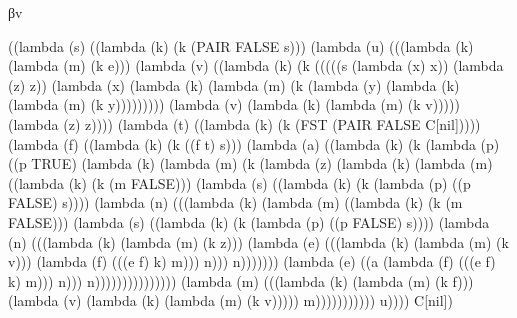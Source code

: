 \documentclass[ms,electronic,twosidetoc,letterpaper,chaptercenter,parttop]{byumsphd}
\begin{document}
\begin{theorem}
βv
\begin{schemedisplay}
((lambda (s) ((lambda (k) (k (PAIR FALSE s)))
        (lambda (u) (((lambda (k) (lambda (m) (k e)))
                (lambda (v) ((lambda (k) (k (((((s (lambda (x) x)) (lambda (z) z))
                                   (lambda (x) (lambda (k) (lambda (m) (k (lambda (y) (lambda (k) (lambda (m) (k y)))))))))
                                  (lambda (v) (lambda (k) (lambda (m) (k v))))) (lambda (z) z))))
                       (lambda (t) ((lambda (k) (k (FST
                                        (PAIR FALSE C[nil]))))
                              (lambda (f) ((lambda (k) (k ((f t) s)))
                                     (lambda (a) ((lambda (k) (k (lambda (p) ((p TRUE)
                                                            (lambda (k) (lambda (m) (k (lambda (z) (lambda (k) (lambda (m) ((lambda (k) (k (m FALSE)))
                                                                                              (lambda (s) ((lambda (k) (k (lambda (p) ((p FALSE) s))))
                                                                                                     (lambda (n) (((lambda (k) (lambda (m) ((lambda (k) (k (m FALSE)))
                                                                                                                          (lambda (s) ((lambda (k) (k (lambda (p) ((p FALSE) s))))
                                                                                                                                 (lambda (n) (((lambda (k) (lambda (m) (k z)))
                                                                                                                                         (lambda (e) (((lambda (k) (lambda (m) (k v)))
                                                                                                                                                 (lambda (f) (((e f) k) m))) n))) n)))))))
                                                                                                             (lambda (e) ((a (lambda (f) (((e f) k) m))) n))) n)))))))))))))))
                                            (lambda (m) (((lambda (k) (lambda (m) (k f)))
                                                    (lambda (v) (lambda (k) (lambda (m) (k v))))) m))))))))))) u))))
 C[nil])
\end{schemedisplay}


\end{theorem}
\end{document}
